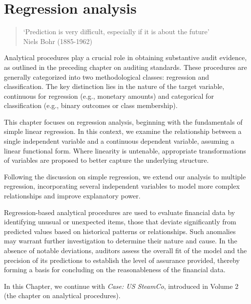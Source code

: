
\chapter{Regression analysis}
\label{cha:introduction_to_regression_analysis}

\raggedbottom

\begin{quote}
`Prediction is very difficult, especially if it is about the future'\\
Niels Bohr (1885-1962)
\end{quote}

Analytical procedures play a crucial role in obtaining substantive audit evidence, as outlined in the preceding chapter on auditing standards. 
These procedures are generally categorized into two methodological classes: regression and classification. 
The key distinction lies in the nature of the target variable, continuous for regression (e.g., monetary amounts) and categorical for classification (e.g., binary outcomes or class membership).

This chapter focuses on regression analysis, beginning with the fundamentals of simple linear regression. 
In this context, we examine the relationship between a single independent variable and a continuous dependent variable, assuming a linear functional form. 
Where linearity is untenable, appropriate transformations of variables are proposed to better capture the underlying structure.

Following the discussion on simple regression, we extend our analysis to multiple regression, incorporating several independent variables to model more complex relationships and improve explanatory power.

Regression-based analytical procedures are used to evaluate financial data by identifying unusual or unexpected items, those that deviate significantly from predicted values based on historical patterns or relationships. 
Such anomalies may warrant further investigation to determine their nature and cause. 
In the absence of notable deviations, auditors assess the overall fit of the model and the precision of its predictions to establish the level of assurance provided, thereby forming a basis for concluding on the reasonableness of the financial data.




\bigskip
In this Chapter, we continue with \textit{Case: US SteamCo}, introduced in Volume 2 (the chapter on analytical procedures).

